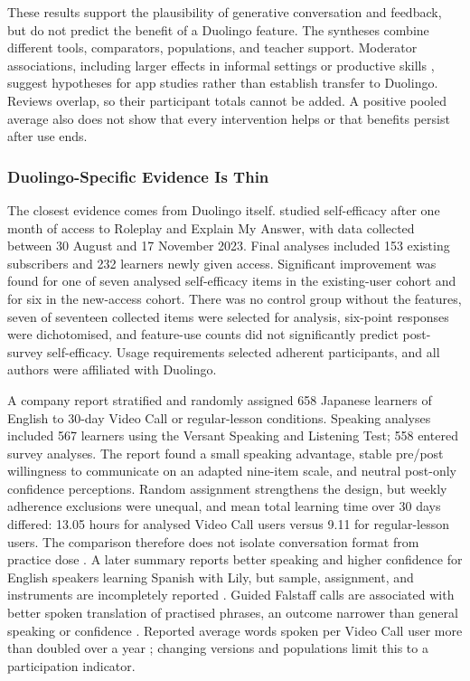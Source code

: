\documentclass[11pt,titlepage]{article}
\begin{document}
These results support the plausibility of generative conversation and feedback, but do not predict the benefit of a Duolingo feature. The syntheses combine different tools, comparators, populations, and teacher support. Moderator associations, including larger effects in informal settings or productive skills \parencite{saarela2026}, suggest hypotheses for app studies rather than establish transfer to Duolingo. Reviews overlap, so their participant totals cannot be added. A positive pooled average also does not show that every intervention helps or that benefits persist after use ends.

\subsubsection{Duolingo-Specific Evidence Is Thin}
The closest evidence comes from Duolingo itself. \textcite{kittredge2025self} studied self-efficacy after one month of access to Roleplay and Explain My Answer, with data collected between 30 August and 17 November 2023. Final analyses included 153 existing subscribers and 232 learners newly given access. Significant improvement was found for one of seven analysed self-efficacy items in the existing-user cohort and for six in the new-access cohort. There was no control group without the features, seven of seventeen collected items were selected for analysis, six-point responses were dichotomised, and feature-use counts did not significantly predict post-survey self-efficacy. Usage requirements selected adherent participants, and all authors were affiliated with Duolingo.

A company report stratified and randomly assigned 658 Japanese learners of English to 30-day Video Call or regular-lesson conditions. Speaking analyses included 567 learners using the Versant Speaking and Listening Test; 558 entered survey analyses. The report found a small speaking advantage, stable pre/post willingness to communicate on an adapted nine-item scale, and neutral post-only confidence perceptions. Random assignment strengthens the design, but weekly adherence exclusions were unequal, and mean total learning time over 30 days differed: 13.05 hours for analysed Video Call users versus 9.11 for regular-lesson users. The comparison therefore does not isolate conversation format from practice dose \parencite[Sections 2.2--2.3, Tables 3--4]{kittredge2025video}. A later summary reports better speaking and higher confidence for English speakers learning Spanish with Lily, but sample, assignment, and instruments are incompletely reported \parencite{videoResearch}. Guided Falstaff calls are associated with better spoken translation of practised phrases, an outcome narrower than general speaking or confidence \parencite{falstaffResearch}. Reported average words spoken per Video Call user more than doubled over a year \parencite{shareholderQ12026}; changing versions and populations limit this to a participation indicator.
\end{document}
